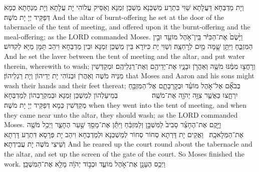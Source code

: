 {{}
{וְיָת מַדְבְּחָא דַּעֲלָתָא שַׁוִּי בִּתְרַע מַשְׁכְּנָא מַשְׁכַּן זִמְנָא וְאַסֵּיק עֲלוֹהִי יָת עֲלָתָא וְיָת מִנְחָתָא כְּמָא דְּפַקֵּיד יְיָ יָת מֹשֶׁה׃}
{And the altar of burnt-offering he set at the door of the tabernacle of the tent of meeting, and offered upon it the burnt-offering and the meal-offering; as the LORD commanded Moses.}{}
{וַיָּ֙שֶׂם֙ אֶת־הַכִּיֹּ֔ר בֵּֽין־אֹ֥הֶל מוֹעֵ֖ד וּבֵ֣ין הַמִּזְבֵּ֑חַ וַיִּתֵּ֥ן שָׁ֛מָּה מַ֖יִם לְרׇחְצָֽה׃}
{וְשַׁוִּי יָת כִּיּוֹרָא בֵּין מַשְׁכַּן זִמְנָא וּבֵין מַדְבְּחָא וִיהַב תַּמָּן מַיָּא לְקִדּוּשׁ׃}
{And he set the laver between the tent of meeting and the altar, and put water therein, wherewith to wash;}{}
{וְרָחֲצ֣וּ מִמֶּ֔נּוּ מֹשֶׁ֖ה וְאַהֲרֹ֣ן וּבָנָ֑יו אֶת־יְדֵיהֶ֖ם וְאֶת־רַגְלֵיהֶֽם׃
}
{וּמְקַדְּשִׁין מִנֵּיהּ מֹשֶׁה וְאַהֲרֹן וּבְנוֹהִי יָת יְדֵיהוֹן וְיָת רַגְלֵיהוֹן׃}
{that Moses and Aaron and his sons might wash their hands and their feet thereat;}{}
{בְּבֹאָ֞ם אֶל־אֹ֣הֶל מוֹעֵ֗ד וּבְקׇרְבָתָ֛ם אֶל־הַמִּזְבֵּ֖חַ יִרְחָ֑צוּ כַּאֲשֶׁ֛ר צִוָּ֥ה יְהֹוָ֖ה אֶת־מֹשֶֽׁה׃ \setuma         
}
{בְּמֵיעַלְהוֹן לְמַשְׁכַּן זִמְנָא וּבְמִקְרַבְהוֹן לְמַדְבְּחָא מְקַדְּשִׁין כְּמָא דְּפַקֵּיד יְיָ יָת מֹשֶׁה׃}
{when they went into the tent of meeting, and when they came near unto the altar, they should wash; as the LORD commanded Moses.}{}
{וַיָּ֣קֶם אֶת־הֶחָצֵ֗ר סָבִיב֙ לַמִּשְׁכָּ֣ן וְלַמִּזְבֵּ֔חַ וַיִּתֵּ֕ן אֶת־מָסַ֖ךְ שַׁ֣עַר הֶחָצֵ֑ר וַיְכַ֥ל מֹשֶׁ֖ה אֶת־הַמְּלָאכָֽה׃ \petucha }
{וַאֲקֵים יָת דָּרְתָא סְחוֹר סְחוֹר לְמַשְׁכְּנָא וּלְמַדְבְּחָא וִיהַב יָת פְּרָסָא דִּתְרַע דָּרְתָא וְשֵׁיצִי מֹשֶׁה יָת עֲבִידְתָא׃}
{And he reared up the court round about the tabernacle and the altar, and set up the screen of the gate of the court. So Moses finished the work.}{}
{וַיְכַ֥ס הֶעָנָ֖ן אֶת־אֹ֣הֶל מוֹעֵ֑ד וּכְב֣וֹד יְהֹוָ֔ה מָלֵ֖א אֶת־הַמִּשְׁכָּֽן׃}
}
